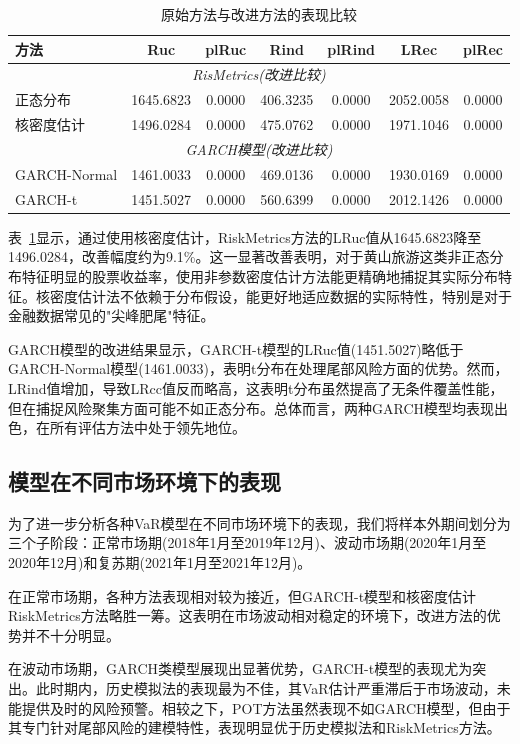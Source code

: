 \documentclass[12pt, a4paper]{article}
\begin{document}
\begin{table}[htbp]
\centering
\caption{原始方法与改进方法的表现比较}
\label{tab}
\begin{tabular}{lcccccc}
\toprule
\textbf{方法} & \textbf{Ruc} & \textbf{plRuc} & \textbf{Rind} & \textbf{plRind} & \textbf{LRec} & \textbf{plRec} \\
\midrule
\multicolumn{7}{c}{\textit{RisMetrics(改进比较)}} \\
正态分布 & 1645.6823 & 0.0000 & 406.3235 & 0.0000 & 2052.0058 & 0.0000 \\
核密度估计 & 1496.0284 & 0.0000 & 475.0762 & 0.0000 & 1971.1046 & 0.0000 \\
\midrule
\multicolumn{7}{c}{\textit{GARCH模型(改进比较)}} \\
GARCH-Normal & 1461.0033 & 0.0000 & 469.0136 & 0.0000 & 1930.0169 & 0.0000 \\
GARCH-t & 1451.5027 & 0.0000 & 560.6399 & 0.0000 & 2012.1426 & 0.0000 \\
\bottomrule
\end{tabular}
\end{table}

表~\ref{tab}显示，通过使用核密度估计，RiskMetrics方法的LRuc值从1645.6823降至1496.0284，改善幅度约为9.1\%。这一显著改善表明，对于黄山旅游这类非正态分布特征明显的股票收益率，使用非参数密度估计方法能更精确地捕捉其实际分布特征。核密度估计法不依赖于分布假设，能更好地适应数据的实际特性，特别是对于金融数据常见的"尖峰肥尾"特征。

GARCH模型的改进结果显示，GARCH-t模型的LRuc值(1451.5027)略低于GARCH-Normal模型(1461.0033)，表明t分布在处理尾部风险方面的优势。然而，LRind值增加，导致LRcc值反而略高，这表明t分布虽然提高了无条件覆盖性能，但在捕捉风险聚集方面可能不如正态分布。总体而言，两种GARCH模型均表现出色，在所有评估方法中处于领先地位。

\subsection{模型在不同市场环境下的表现}

为了进一步分析各种VaR模型在不同市场环境下的表现，我们将样本外期间划分为三个子阶段：正常市场期(2018年1月至2019年12月)、波动市场期(2020年1月至2020年12月)和复苏期(2021年1月至2021年12月)。

在正常市场期，各种方法表现相对较为接近，但GARCH-t模型和核密度估计RiskMetrics方法略胜一筹。这表明在市场波动相对稳定的环境下，改进方法的优势并不十分明显。

在波动市场期，GARCH类模型展现出显著优势，GARCH-t模型的表现尤为突出。此时期内，历史模拟法的表现最为不佳，其VaR估计严重滞后于市场波动，未能提供及时的风险预警。相较之下，POT方法虽然表现不如GARCH模型，但由于其专门针对尾部风险的建模特性，表现明显优于历史模拟法和RiskMetrics方法。
\end{document}
